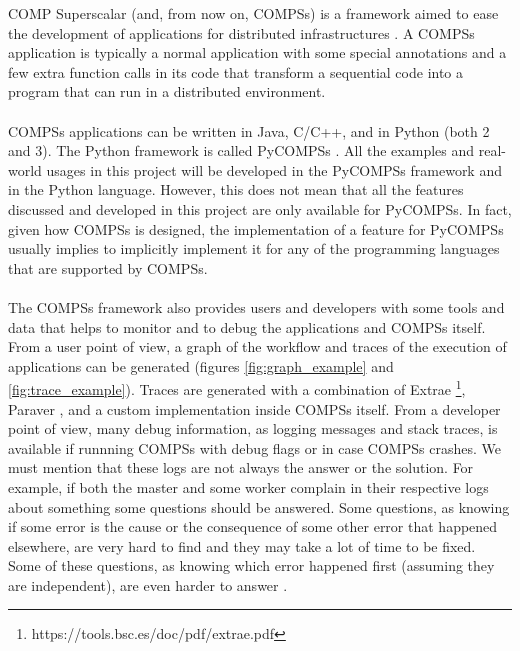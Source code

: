 \label{sec:compss}
COMP Superscalar (and, from now on, COMPSs) is a framework aimed to ease the development of applications for distributed infrastructures \cite{compss} \cite{Lordan2014}. A COMPSs application is typically a normal application with some special annotations and a few extra function calls in its code that transform a sequential code into a program that can run in a distributed environment.\\
\\
COMPSs applications can be written in Java, C/C++, and in Python (both 2 and 3). The Python framework is called PyCOMPSs \cite{pycompss}. All the examples and real-world usages in this project will be developed in the PyCOMPSs framework and in the Python language. However, this does not mean that all the features discussed and developed in this project are only available for PyCOMPSs. In fact, given how COMPSs is designed, the implementation of a feature for PyCOMPSs usually implies to implicitly implement it for any of the programming languages that are supported by COMPSs.\\
\\
The COMPSs framework also provides users and developers with some tools and data that helps to monitor and to debug the applications and COMPSs itself. From a user point of view, a graph of the workflow and traces of the execution of applications can be generated (figures \ref{fig:graph_example}  and \ref{fig:trace_example}). Traces are generated with a combination of Extrae \footnote{https://tools.bsc.es/doc/pdf/extrae.pdf}, Paraver \cite{paraver}, and a custom implementation inside COMPSs itself. From a developer point of view, many debug information, as logging messages and stack traces, is available if runnning COMPSs with debug flags or in case COMPSs crashes. We must mention that these logs are not always the answer or the solution. For example, if both the master and some worker complain in their respective logs about something some questions should be answered. Some questions, as knowing if some error is the cause or the consequence of some other error that happened elsewhere, are very hard to find and they may take a lot of time to be fixed.  Some of these questions, as knowing which error happened first (assuming they are independent), are even harder to answer \cite{Lamport}. 

